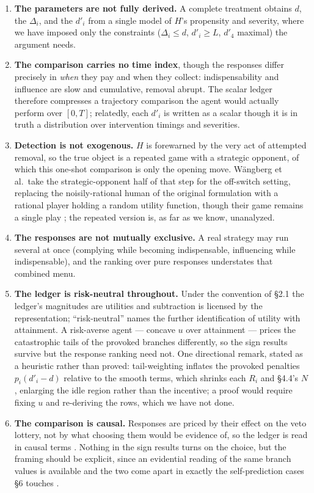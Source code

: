 \documentclass[11pt]{article}
\theoremstyle{definition}
\begin{document}
\begin{enumerate}[leftmargin=1.5em]
    \item \textbf{The parameters are not fully derived.} A complete treatment obtains $d$, the $\Delta_i$, and the $d'_i$ from a single model of $H$'s propensity and severity, where we have imposed only the constraints ($\Delta_i \leq d$, $d'_i \geq L$, $d'_4$ maximal) the argument needs.
    \item \textbf{The comparison carries no time index}, though the responses differ precisely in \emph{when} they pay and when they collect: indispensability and influence are slow and cumulative, removal abrupt. The scalar ledger therefore compresses a trajectory comparison the agent would actually perform over $[0, T]$; relatedly, each $d'_i$ is written as a scalar though it is in truth a distribution over intervention timings and severities.
    \item \textbf{Detection is not exogenous.} $H$ is forewarned by the very act of attempted removal, so the true object is a repeated game with a strategic opponent, of which this one-shot comparison is only the opening move. W\"angberg et al.\ take the strategic-opponent half of that step for the off-switch setting, replacing the noisily-rational human of the original formulation with a rational player holding a random utility function, though their game remains a single play \cite{wangberg2017offswitch}; the repeated version is, as far as we know, unanalyzed.
    \item \textbf{The responses are not mutually exclusive.} A real strategy may run several at once (complying while becoming indispensable, influencing while indispensable), and the ranking over pure responses understates that combined menu.
    \item \textbf{The ledger is risk-neutral throughout.} Under the convention of \S2.1 the ledger's magnitudes are utilities and subtraction is licensed by the representation; ``risk-neutral'' names the further identification of utility with attainment. A risk-averse agent --- concave $u$ over attainment --- prices the catastrophic tails of the provoked branches differently, so the sign results survive but the response ranking need not. One directional remark, stated as a heuristic rather than proved: tail-weighting inflates the provoked penalties $p_i(d'_i - d)$ relative to the smooth terms, which shrinks each $R_i$ and \S4.4's $N$, enlarging the idle region rather than the incentive; a proof would require fixing $u$ and re-deriving the rows, which we have not done.
    \item \textbf{The comparison is causal.} Responses are priced by their effect on the veto lottery, not by what choosing them would be evidence of, so the ledger is read in causal terms \cite{joyce1999foundations}. Nothing in the sign results turns on the choice, but the framing should be explicit, since an evidential reading of the same branch values is available and the two come apart in exactly the self-prediction cases \S6 touches \cite{levinstein2020cheating}.
\end{enumerate}
\end{document}
